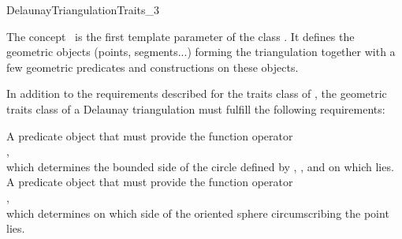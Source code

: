 

\begin{ccRefConcept}{DelaunayTriangulationTraits_3}

\ccDefinition
The concept \ccRefName\ is the first template parameter of the class
. It defines the geometric objects (points,
segments...) forming the triangulation together with a few geometric
predicates and constructions on these objects.

\ccRefines {}

In addition to the requirements described for the traits class of
, the geometric traits class of a
Delaunay triangulation must fulfill the following requirements:

\ccTypes
{}

\ccGlue
{}
\ccGlue
{}


{A predicate object that must provide the function operator\\
,\\
which determines the bounded side of the circle defined
by , , and  on which  lies.
}
\ccGlue
{}
{A predicate object that must provide the function operator\\
,\\
which determines on which side of the oriented sphere circumscribing 
 the point  lies.}


\end{ccRefConcept}
